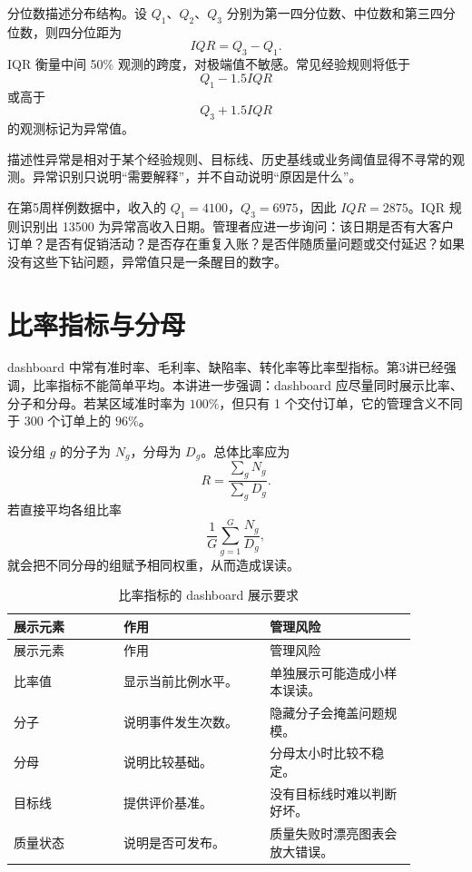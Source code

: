 \documentclass[UTF8,fontset=fandol,openany,zihao=-4]{ctexbook}
\begin{document}
分位数描述分布结构。设 \(Q_1\)、\(Q_2\)、\(Q_3\) 分别为第一四分位数、中位数和第三四分位数，则四分位距为
\[
IQR=Q_3-Q_1.
\]
IQR 衡量中间 50\% 观测的跨度，对极端值不敏感。常见经验规则将低于
\[
Q_1-1.5IQR
\]
或高于
\[
Q_3+1.5IQR
\]
的观测标记为异常值。

\begin{definition}[描述性异常]
描述性异常是相对于某个经验规则、目标线、历史基线或业务阈值显得不寻常的观测。异常识别只说明“需要解释”，并不自动说明“原因是什么”。
\end{definition}

在第5周样例数据中，收入的 \(Q_1=4100\)，\(Q_3=6975\)，因此 \(IQR=2875\)。IQR 规则识别出 13500 为异常高收入日期。管理者应进一步询问：该日期是否有大客户订单？是否有促销活动？是否存在重复入账？是否伴随质量问题或交付延迟？如果没有这些下钻问题，异常值只是一条醒目的数字。

\section{比率指标与分母}

dashboard 中常有准时率、毛利率、缺陷率、转化率等比率型指标。第3讲已经强调，比率指标不能简单平均。本讲进一步强调：dashboard 应尽量同时展示比率、分子和分母。若某区域准时率为 \(100\%\)，但只有 1 个交付订单，它的管理含义不同于 300 个订单上的 \(96\%\)。

设分组 \(g\) 的分子为 \(N_g\)，分母为 \(D_g\)。总体比率应为
\[
R=\frac{\sum_g N_g}{\sum_g D_g}.
\]
若直接平均各组比率
\[
\frac{1}{G}\sum_{g=1}^G \frac{N_g}{D_g},
\]
就会把不同分母的组赋予相同权重，从而造成误读。

\begin{longtable}{>{\raggedright\arraybackslash}p{0.24\linewidth}>{\raggedright\arraybackslash}p{0.32\linewidth}>{\raggedright\arraybackslash}p{0.32\linewidth}}
\caption{比率指标的 dashboard 展示要求}\\
\toprule
展示元素 & 作用 & 管理风险\\
\midrule
\endfirsthead
\toprule
展示元素 & 作用 & 管理风险\\
\midrule
\endhead
比率值 & 显示当前比例水平。 & 单独展示可能造成小样本误读。\\
分子 & 说明事件发生次数。 & 隐藏分子会掩盖问题规模。\\
分母 & 说明比较基础。 & 分母太小时比较不稳定。\\
目标线 & 提供评价基准。 & 没有目标线时难以判断好坏。\\
质量状态 & 说明是否可发布。 & 质量失败时漂亮图表会放大错误。\\
\bottomrule
\end{longtable}
\end{document}
